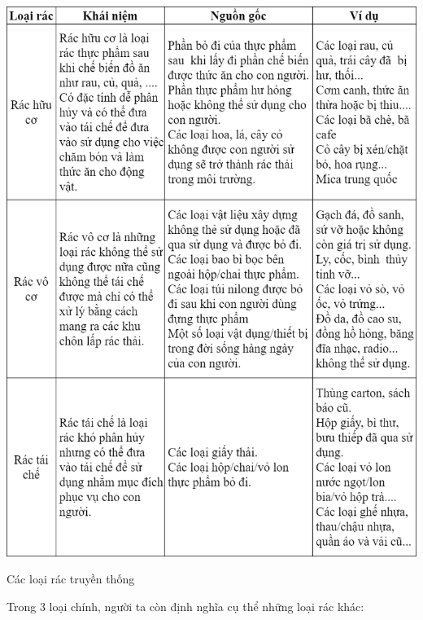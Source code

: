 \begin{table}[H]
    \centering
    \includegraphics[width=\textwidth]{images/TraditionalTrash.png}
    \caption{Các loại rác truyền thống} 
    \label{tab.garbage.type}
\end{table}
Trong 3 loại chính, người ta còn định nghĩa cụ thể những loại rác khác:

